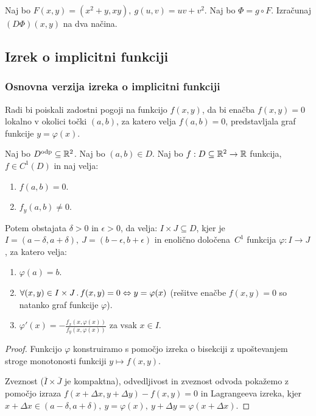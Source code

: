 \begin{zgled}
    Naj bo $F(x,y) = (x^2 + y, xy), \ g(u, v) = uv + v^2$. Naj bo $\Phi = g \circ F$. Izračunaj $(D\Phi)(x,y)$ na dva načina.
\end{zgled}

\newpage
\subsection{Izrek o implicitni funkciji}
\subsubsection{Osnovna verzija izreka o implicitni funkciji}
Radi bi poiskali zadostni pogoji na funkcijo $f(x, y)$, da bi enačba $f(x, y) = 0$ lokalno v okolici točki $(a,b)$, za katero velja $f(a,b) = 0$, predstavljala graf funkcije $y = \varphi(x)$.

\begin{izrek}
    Naj bo $D^{\text{odp}} \subseteq \mathbb{R}^2$. Naj bo $(a, b) \in D$. Naj bo $f: D \subseteq \mathbb{R}^2 \to \mathbb{R}$ funkcija, $f \in C^1(D)$ in naj velja:
    \begin{enumerate}
        \item $f(a,b) = 0$.
        \item $f_y(a,b) \neq 0$.
    \end{enumerate}
    Potem obstajata $\delta > 0$ in $\epsilon > 0$, da velja: $I \times J \subseteq D$, kjer je $I = (a - \delta, a + \delta), \ J = (b-\epsilon, b+\epsilon)$ in enolično določena~$C^1$ funkcija $\varphi: I \to J$, za katero velja:
    \begin{enumerate}
        \item $\varphi(a) = b$.
        \item $\forall (x,y) \in I \times J \,.\, f(x, y) = 0 \Leftrightarrow y = \varphi (x)$ (rešitve enačbe $f(x,y) = 0$ so natanko graf funkcije $\varphi$).
        \item $\varphi'(x) = -\frac{f_x(x, \varphi(x))}{f_y(x, \varphi(x))}$ za vsak $x \in I$.
    \end{enumerate}
\end{izrek}

\begin{proof}
    Funkcijo $\varphi$ konstruiramo s pomočjo izreka o bisekciji z upoštevanjem stroge monotonosti funkciji $y \mapsto f(x, y)$.

    Zveznost ($\overline{I} \times \overline{J}$ je kompaktna), odvedljivost in zveznost odvoda pokažemo z pomočjo izraza $f(x + \Delta x, y + \Delta y) - f(x,y) = 0$ in Lagrangeeva izreka, kjer $x + \Delta x \in (a - \delta, a + \delta), \ y= \varphi (x), \ y + \Delta y = \varphi(x + \Delta x)$.
\end{proof}


